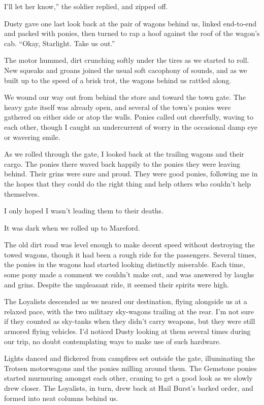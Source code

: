 \leavevmode{}I’ll let her know,” the soldier replied, and zipped off.

Dusty gave one last look back at the pair of wagons behind us, linked end-to-end and packed with ponies, then turned to rap a hoof against the roof of the wagon’s cab. “Okay, Starlight. Take us out.”

The motor hummed, dirt crunching softly under the tires as we started to roll. New squeaks and groans joined the usual soft cacophony of sounds, and as we built up to the speed of a brisk trot, the wagons behind us rattled along.

We wound our way out from behind the store and toward the town gate. The heavy gate itself was already open, and several of the town’s ponies were gathered on either side or atop the walls. Ponies called out cheerfully, waving to each other, though I caught an undercurrent of worry in the occasional damp eye or wavering smile.

As we rolled through the gate, I looked back at the trailing wagons and their cargo. The ponies there waved back happily to the ponies they were leaving behind. Their grins were sure and proud. They were good ponies, following me in the hopes that they could do the right thing and help others who couldn’t help themselves.

I only hoped I wasn’t leading them to their deaths.

{\br}%
It was dark when we rolled up to Mareford.

The old dirt road was level enough to make decent speed without destroying the towed wagons, though it had been a rough ride for the passengers. Several times, the ponies in the wagons had started looking distinctly miserable. Each time, some pony made a comment we couldn’t make out, and was answered by laughs and grins. Despite the unpleasant ride, it seemed their spirits were high.

The Loyalists descended as we neared our destination, flying alongside us at a relaxed pace, with the two military sky-wagons trailing at the rear. I’m not sure if they counted as sky-tanks when they didn’t carry weapons, but they were still armored flying vehicles. I’d noticed Dusty looking at them several times during our trip, no doubt contemplating ways to make use of such hardware.

Lights danced and flickered from campfires set outside the gate, illuminating the Trotsen motorwagons and the ponies milling around them. The Gemstone ponies started murmuring amongst each other, craning to get a good look as we slowly drew closer. The Loyalists, in turn, drew back at Hail Burst’s barked order, and formed into neat columns behind us.

